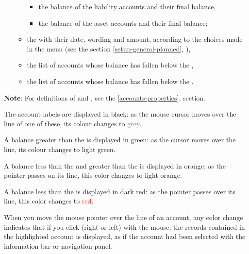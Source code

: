 \begin{itemize}
\begin{itemize}
\begin{itemize}
					\item the balance of the liability accounts and their final balance,
					\item the balance of the asset accounts and their final balance;
				\end{itemize}
			\item the  with their date, wording and amount, according to the choices made in the  menu (see the section \vref{setup-general-planned}, ),
			\item the list of accounts whose balance has fallen below the ,
			\item the list of accounts whose balance has fallen below the .
		\end{itemize}
\end{itemize}


\textbf{Note}: For definitions of  and , see the \vref{accounts-properties},  section.


The account labels are displayed in \textcolor{black}{black}: as the mouse cursor moves over the line of one of these, its colour changes to \textcolor{gray}{grey}.

A balance greater than the  is displayed in \textcolor[RGB]{0,126,0}{green}: as the cursor moves over the line, its colour changes to \textcolor[RGB]{0,227,0}{light green}.

A balance less than the  and greater than the  is displayed in \textcolor[RGB]{230,155,0}{orange}: as the pointer passes on its line, this color changes to \textcolor[RGB]{255,200,0}{light orange}.

A balance less than the    is displayed in \textcolor[RGB]{153,0,0}{dark red}: as the pointer passes over its line, this color changes to \textcolor{red}{red}.

When you move the mouse pointer over the line of an account, any color change indicates that if you click (right or left) with the mouse, the records contained in the highlighted account is displayed, as if the account had been selected with the information bar or navigation panel.

